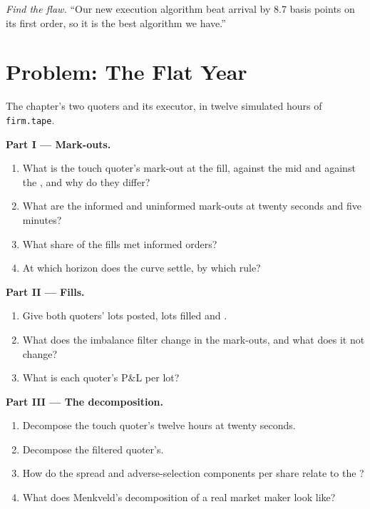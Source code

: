 \begin{exercise}[$\star\star\star$]\label{exo:rs:measuring-market-making-and-execution:8}
\emph{Find the flaw.} ``Our new execution algorithm beat arrival by 8.7 basis points on its first order, so it is the best algorithm we have.''
\end{exercise}

\section{Problem: The Flat Year}

\begin{problem}\label{pb:rs:measuring-market-making-and-execution:1}
The chapter's two quoters and its executor, in twelve simulated hours of \texttt{firm.tape}.

\medskip\noindent\textbf{Part I --- Mark-outs.}
\begin{enumerate}
\item What is the touch quoter's mark-out at the fill, against the mid and against the , and why do they differ?
\item What are the informed and uninformed mark-outs at twenty seconds and five minutes?
\item What share of the fills met informed orders?
\item At which horizon does the curve settle, by which rule?
\end{enumerate}

\medskip\noindent\textbf{Part II --- Fills.}
\begin{enumerate}[resume]
\item Give both quoters' lots posted, lots filled and .
\item What does the imbalance filter change in the mark-outs, and what does it not change?
\item What is each quoter's P\&L per lot?
\end{enumerate}

\medskip\noindent\textbf{Part III --- The decomposition.}
\begin{enumerate}[resume]
\item Decompose the touch quoter's twelve hours at twenty seconds.
\item Decompose the filtered quoter's.
\item How do the spread and adverse-selection components per share relate to the ?
\item What does Menkveld's decomposition of a real market maker look like?
\end{enumerate}


\end{problem}
